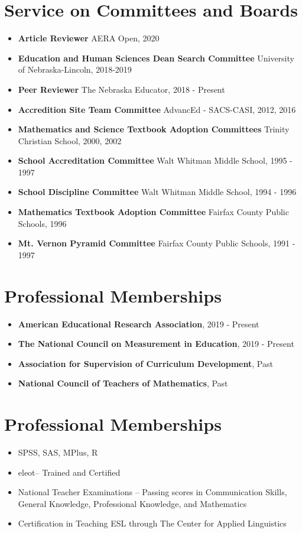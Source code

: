 \documentclass[letterpaper,11pt]{article}
\begin{document}
\section{Service on Committees and Boards}
 \begin{itemize}[leftmargin=0.15in, label={}]
         \item \textbf{Article Reviewer} AERA Open, 2020
     \item \textbf{Education and Human Sciences Dean Search Committee} University of Nebraska-Lincoln, 2018-2019
     \item \textbf{Peer Reviewer} The Nebraska Educator, 2018 - Present
     \item \textbf{Accredition Site Team Committee } AdvancEd - SACS-CASI, 2012, 2016
     \item \textbf{Mathematics and Science Textbook Adoption Committees} Trinity Christian School, 2000, 2002
     \item \textbf{School Accreditation Committee} Walt Whitman Middle School, 1995 - 1997
     \item \textbf{School Discipline Committee} Walt Whitman Middle School, 1994 - 1996
     \item \textbf{Mathematics Textbook Adoption Committee} Fairfax County Public Schools, 1996
     \item \textbf{Mt. Vernon Pyramid Committee} Fairfax County Public Schools, 1991 - 1997
  \end{itemize}

\section{Professional Memberships}
 \begin{itemize}[leftmargin=0.15in, label={}]
     \item \textbf{American Educational Research Association}, 2019 - Present
     \item \textbf{The National Council on Measurement in Education}, 2019 - Present
     \item \textbf{Association for Supervision of Curriculum Development}, Past
     \item \textbf{National Council of Teachers of Mathematics}, Past
  \end{itemize}

\section{Professional Memberships}
 \begin{itemize}[leftmargin=0.15in, label={}]
     \item SPSS, SAS, MPlus, R
     \item eleot\textregistered – Trained and Certified
     \item National Teacher Examinations – Passing scores in Communication Skills, General Knowledge, Professional Knowledge, and Mathematics
     \item Certification in Teaching ESL through The Center for Applied Linguistics
  \end{itemize}
\end{document}
